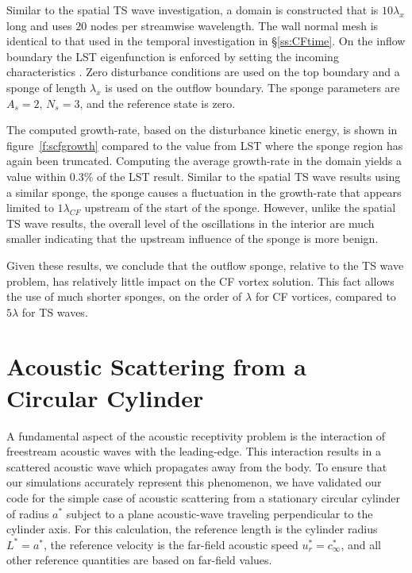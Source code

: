 Similar to the spatial TS wave investigation, a domain is constructed that is
$10 \lambda_x$ long and uses $20$ nodes per streamwise wavelength.  The wall
normal mesh is identical to that used in the temporal investigation in
\S\ref{ss:CFtime}.  On the inflow boundary the LST eigenfunction is enforced
by setting the incoming characteristics \cite{Giles:90}.  Zero disturbance
conditions are used on the top boundary and a sponge of length $\lambda_x$ is
used on the outflow boundary.  The sponge parameters are $A_s=2$, $N_s=3$, and
the reference state is zero.

The computed growth-rate, based on the disturbance kinetic energy, is shown in
figure~\ref{f:scfgrowth} compared to the value from LST where the sponge
region has again been truncated.  Computing the average growth-rate in the
domain yields a value within $0.3\%$ of the LST result.  Similar to the
spatial TS wave results using a similar sponge, the sponge causes a
fluctuation in the growth-rate that appears limited to $ 1 \lambda_{CF}$
upstream of the start of the sponge.  However, unlike the spatial TS wave
results, the overall level of the oscillations in the interior are much
smaller indicating that the upstream influence of the sponge is more benign.

Given these results, we conclude that the outflow sponge, relative to the TS
wave problem, has relatively little impact on the CF vortex solution.  This
fact allows the use of much shorter sponges, on the order of $\lambda$ for
CF vortices, compared to $5\lambda$ for TS waves.

\section{Acoustic Scattering from a Circular Cylinder\label{s:scat}}

A fundamental aspect of the acoustic receptivity problem is the interaction of
free\-stream acoustic waves with the leading-edge.  This interaction results
in a scattered acoustic wave which propagates away from the body. To ensure
that our simulations accurately represent this phenomenon, we have validated
our code for the simple case of acoustic scattering from a stationary circular
cylinder of radius $a^*$ subject to a plane acoustic-wave traveling
perpendicular to the cylinder axis.  For this calculation, the reference
length is the cylinder radius $L^* = a^*$, the reference velocity is the
far-field acoustic speed $u^*_r = c^*_\infty$, and all other reference
quantities are based on far-field values.

